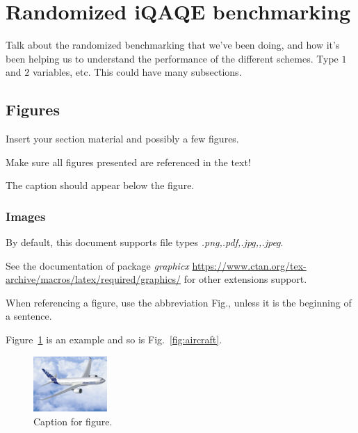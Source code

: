 \section{Randomized iQAQE benchmarking}
\label{section:Randomized_iQAQE_benchmarking}

Talk about the randomized benchmarking that we've been doing, and how it's been helping us to understand the performance of the different schemes. Type $1$ and $2$ variables, etc. This could have many subsections.






\subsection{Figures}
\label{subsection:figures}

Insert your section material and possibly a few figures.

Make sure all figures presented are referenced in the text!

The caption should appear below the figure.


\subsubsection{Images}
\label{subsection:images}

By default, this document supports file types {\it .png,.pdf,.jpg,,.jpeg}.

See the documentation of package {\it graphicx} \url{https://www.ctan.org/tex-archive/macros/latex/required/graphics/} for other extensions support.

When referencing a figure, use the abbreviation Fig., unless it is the beginning of a sentence.

Figure~\ref{fig:airbus1} is an example and so is Fig.~\ref{fig:aircraft}.

\begin{figure}[!htb]
  \centering
  \includegraphics[width=0.25\textwidth]{Figures/Airbus_A350.jpg}
  \caption[Optional caption for figure in TOC.]{Caption for figure.}
  \label{fig:airbus1}
\end{figure}


